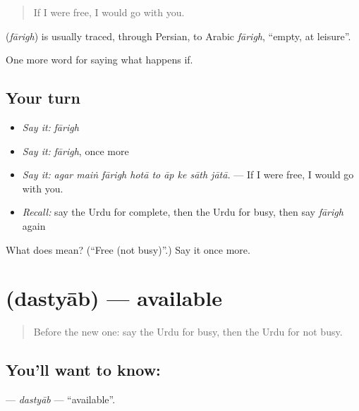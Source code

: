 \begin{quote}
If I were free, I would go with you.
\end{quote}

\begin{cousinweb}
\textbf{} (\emph{fārigh}) is usually traced, through Persian, to Arabic \emph{fārigh}, \textquotedblleft{}empty, at leisure\textquotedblright{}.
\end{cousinweb}

\begin{grammarlens}[title={What you've built}]
One more word for saying what happens if.
\end{grammarlens}

\subsection*{Your turn}
\begin{itemize}
\raggedright
  \item \emph{Say it:} \emph{fārigh}
  \item \emph{Say it:} \emph{fārigh}, once more
  \item \emph{Say it:} \emph{agar maiṅ fārigh hotā to āp ke sāth jātā.} — If I were free, I would go with you.
  \item \emph{Recall:} say the Urdu for complete, then the Urdu for busy, then say \emph{fārigh} again
\end{itemize}

\begin{tcolorbox}[breakable,colback=teal!4,colframe=teal!35!black,title={Before you move on}]
What does  mean? (\textquotedblleft{}Free (not busy)\textquotedblright{}.) Say it once more.
\end{tcolorbox}
\section[\texorpdfstring{\ur{دستیاب} (dastyāb)}{دستیاب (dastyāb)}]{ (dastyāb) — available}

\label{lesson:UR-C527-dastyab}



\begin{quote}
Before the new one: say the Urdu for busy, then the Urdu for not busy.
\end{quote}

\subsection*{You'll want to know: }
\textbf{} — \emph{dastyāb} — \textquotedblleft{}available\textquotedblright{}.

